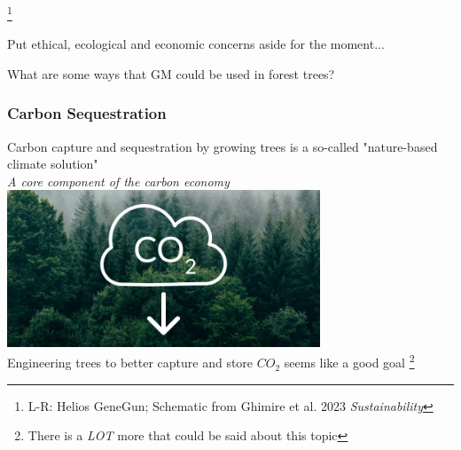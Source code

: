 \documentclass[xcolor=dvipsnames]{beamer}
\newcommand\blfootnote[1]{%
	\begingroup
	\renewcommand\thefootnote{}\footnote{#1}%
	\addtocounter{footnote}{-1}%
	\endgroup
}
\begin{document}
\begin{frame}
\begin{columns}
\begin{column}{0.8\textwidth}
		\end{column}
	\end{columns}	
	\blfootnote{L-R: Helios GeneGun; Schematic from Ghimire et al. 2023 \textit{Sustainability}}
\end{frame}





\begin{frame}

\scriptsize{Put ethical, ecological and economic concerns aside for the moment...}

\Huge{What are some ways that GM could be used in forest trees?}
	
\end{frame}


\begin{frame}
	\frametitle{Carbon Sequestration}
\centering 	
	Carbon capture and sequestration by growing trees is a so-called "nature-based climate solution"\\
	
\textit{A core component of the carbon economy}\\
	
\vspace{10pt}
\includegraphics[keepaspectratio, width  = 0.7\textwidth]{img/sequestration}\\

\vspace{10pt}
	Engineering trees to better capture and store $CO_2$ seems like a good goal 
	\blfootnote{There is a \textit{LOT} more that could be said about this topic}
\end{frame}
\end{document}
